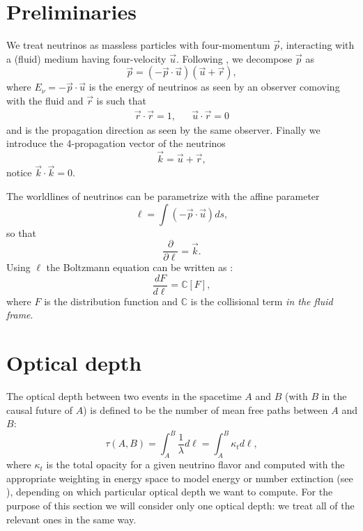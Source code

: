 \section{Preliminaries}
We treat neutrinos as massless particles with four-momentum $\vec{p}$,
interacting with a (fluid) medium having four-velocity $\vec{u}$. Following
\cite{THCode_THCLeakageM0_Thorne1981}, we decompose $\vec{p}$ as
\begin{equation}
  \vec{p} = (-\vec{p}\cdot\vec{u})(\vec{u} + \vec{r}),
\end{equation}
where $E_\nu = - \vec{p}\cdot\vec{u}$ is the energy of neutrinos as seen by an
observer comoving with the fluid and $\vec{r}$ is such that
\begin{align}
  \vec{r} \cdot \vec{r} = 1, &&
  \vec{u} \cdot \vec{r} = 0
\end{align}
and is the propagation direction as seen by the same observer. Finally we
introduce the 4-propagation vector of the neutrinos
\begin{equation}
  \vec{k} = \vec{u} + \vec{r},
\end{equation}
notice $\vec{k}\cdot\vec{k} = 0$.

The worldlines of neutrinos can be parametrize with the affine parameter
\begin{equation}
  \ell = \int (-\vec{p}\cdot\vec{u}) ds,
\end{equation}
so that
\begin{equation}
  \frac{\partial}{\partial\ell} = \vec{k}.
\end{equation}
Using $\ell$ the Boltzmann equation can be written as
\cite{THCode_THCLeakageM0_Thorne1981}:
\begin{equation}
  \frac{dF}{d\ell} = \mathbb{C}[F],
\end{equation}
where $F$ is the distribution function and $\mathbb{C}$ is the collisional term
\emph{in the fluid frame}.

\section{Optical depth}
The optical depth between two events in the spacetime $A$ and $B$ (with $B$ in
the causal future of $A$) is defined to be the number of mean free paths between
$A$ and $B$:
\begin{equation}
  \tau(A,B) = \int_A^B \frac{1}{\lambda} d\ell = \int_A^B \kappa_t d\ell,
\end{equation}
where $\kappa_t$ is the total opacity for a given neutrino flavor and computed
with the appropriate weighting in energy space to model energy or number
extinction (see \cite{THCode_THCLeakageM0_Ruffert1996}), depending on which
particular optical depth we want to compute. For the purpose of this section we
will consider only one optical depth: we treat all of the relevant ones in the
same way.

